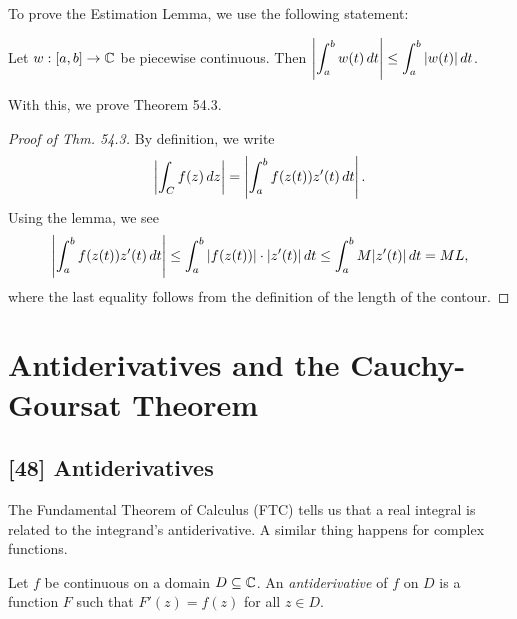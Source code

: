 \documentclass{article}
\begin{document}
To prove the Estimation Lemma, we use the following statement:
\newpage
\begin{lemma}
Let $w: [a,b]\to\mathbb C$ be piecewise continuous. Then $\displaystyle\left|\int_a^b w(t)\, dt\right| \leq \int_a^b |w(t)|\, dt$.
\end{lemma}
With this, we prove Theorem 54.3.
\begin{proof}[Proof of Thm. 54.3]
By definition, we write
$$\left|\int_C f(z)\, dz\right| = \left|\int_a^b f(z(t))z'(t)\, dt\right|.$$
Using the lemma, we see
$$\left|\int_a^b f(z(t))z'(t)\, dt\right| \leq \int_a^b |f(z(t))| \cdot |z'(t)| \, dt \leq \int_a^b M|z'(t)|\, dt = ML,$$
where the last equality follows from the definition of the length of the contour.
\end{proof}
\setcounter{section}{59}
\section{Antiderivatives and the Cauchy-Goursat Theorem}
\subsection*{[48] Antiderivatives}
The Fundamental Theorem of Calculus (FTC) tells us that a real integral is related to the integrand's antiderivative. A similar thing happens for complex functions.
\begin{definition}
Let $f$ be continuous on a domain $D\subseteq \mathbb C$. An \textit{antiderivative} of $f$ on $D$ is a function $F$ such that $F'(z) = f(z)$ for all $z\in D$.
\end{definition}
\end{document}
